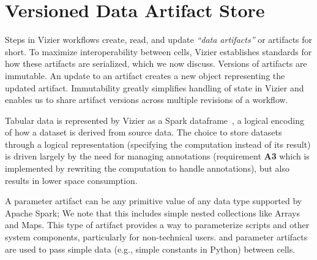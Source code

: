 \section{Versioned Data Artifact Store}
\label{sec:data-artifacts}

Steps in Vizier workflows create, read, and update \textit{``data artifacts''} or artifacts for short.
To maximize interoperability between cells, Vizier establishes standards for how these artifacts are serialized, which we now discuss. Versions of artifacts are immutable. 
An update to an artifact creates a new object representing the updated artifact. Immutability greatly simplifies handling of state in Vizier and enables us to share artifact versions across multiple revisions of a workflow.

Tabular data is represented by Vizier as a Spark dataframe~\cite{AX15}, a logical encoding of how a dataset is derived from source data.
The choice to store datasets through a logical representation (specifying the computation instead of its result) is driven largely by the need for managing annotations (requirement \textbf{A3} which is implemented by rewriting the computation to handle annotations), but also results in lower space consumption.


A parameter artifact can be any primitive value of any data type supported by Apache Spark; We note that this includes simple nested collections like Arrays and Maps.
This type of artifact provides a way to parameterize scripts and other system components, particularly for non-technical users.
and parameter artifacts are used to pass simple data (e.g., simple constants in Python) between cells.

